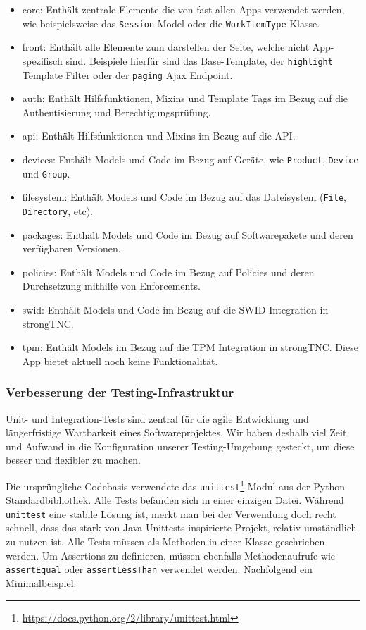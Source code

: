 \begin{itemize}
	\item core: Enthält zentrale Elemente die von fast allen Apps verwendet
		werden, wie beispielsweise das \texttt{Session} Model oder die
		\texttt{WorkItemType} Klasse.
	\item front: Enthält alle Elemente zum darstellen der Seite, welche nicht
		App-spezifisch sind. Beispiele hierfür sind das Base-Template, der
		\texttt{highlight} Template Filter oder der \texttt{paging} Ajax Endpoint.
	\item auth: Enthält Hilfsfunktionen, Mixins und Template Tags im Bezug auf die
		Authentisierung und Berechtigungsprüfung.
	\item api: Enthält Hilfsfunktionen und Mixins im Bezug auf die API.
	\item devices: Enthält Models und Code im Bezug auf Geräte, wie
		\texttt{Product}, \texttt{Device} und \texttt{Group}.
	\item filesystem: Enthält Models und Code im Bezug auf das Dateisystem
		(\texttt{File}, \texttt{Directory}, etc).
	\item packages: Enthält Models und Code im Bezug auf Softwarepakete und deren
		verfügbaren Versionen.
	\item policies: Enthält Models und Code im Bezug auf Policies und deren
		Durchsetzung mithilfe von Enforcements.
	\item swid: Enthält Models und Code im Bezug auf die SWID Integration in
		strongTNC.
	\item tpm: Enthält Models im Bezug auf die TPM Integration in
		strongTNC. Diese App bietet aktuell noch keine Funktionalität.
\end{itemize}

\subsubsection{Verbesserung der Testing-Infrastruktur}
\label{improvements:tests}

Unit- und Integration-Tests sind zentral für die agile Entwicklung und
längerfristige Wartbarkeit eines Softwareprojektes. Wir haben deshalb viel Zeit
und Aufwand in die Konfiguration unserer Testing-Umgebung gesteckt, um diese
besser und flexibler zu machen.

Die ursprüngliche Codebasis verwendete das
\texttt{unittest}\footnote{\url{https://docs.python.org/2/library/unittest.html}}
Modul aus der Python Standardbibliothek. Alle Tests befanden sich in einer
einzigen Datei.  Während \texttt{unittest} eine stabile Lösung ist, merkt man
bei der Verwendung doch recht schnell, dass das stark von Java Unittests
inspirierte Projekt, relativ umständlich zu nutzen ist. Alle Tests müssen als
Methoden in einer Klasse geschrieben werden. Um Assertions zu definieren,
müssen ebenfalls Methodenaufrufe wie \texttt{assertEqual} oder
\texttt{assertLessThan} verwendet werden. Nachfolgend ein Minimalbeispiel:

